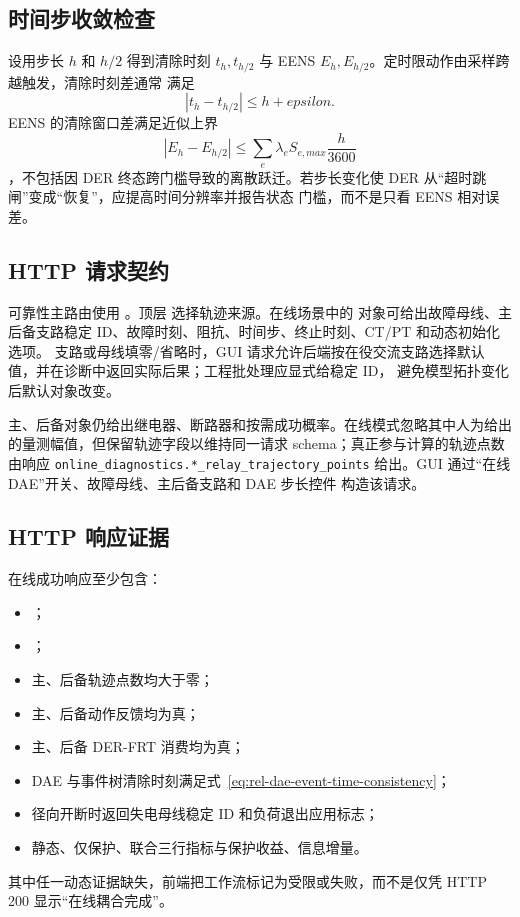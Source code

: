\subsection{时间步收敛检查}
设用步长 $h$ 和 $h/2$ 得到清除时刻 $t_h,t_{h/2}$ 与 EENS $E_h,E_{h/2}$。定时限动作由采样跨越触发，清除时刻差通常
满足
\begin{equation}
 |t_h-t_{h/2}|\le h+epsilon.
\end{equation}
EENS 的清除窗口差满足近似上界
\begin{equation}
 |E_h-E_{h/2}|\le\sum_e\lambda_e S_{e,max}\frac{h}{3600}
\end{equation}
，不包括因 DER 终态跨门槛导致的离散跃迁。若步长变化使 DER 从“超时跳闸”变成“恢复”，应提高时间分辨率并报告状态
门槛，而不是只看 EENS 相对误差。

\subsection{HTTP 请求契约}
可靠性主路由使用 。顶层
 选择轨迹来源。在线场景中的
 对象可给出故障母线、主后备支路稳定 ID、故障时刻、阻抗、时间步、终止时刻、CT/PT 和动态初始化选项。
支路或母线填零/省略时，GUI 请求允许后端按在役交流支路选择默认值，并在诊断中返回实际后果；工程批处理应显式给稳定 ID，
避免模型拓扑变化后默认对象改变。

主、后备对象仍给出继电器、断路器和按需成功概率。在线模式忽略其中人为给出的量测幅值，但保留轨迹字段以维持同一请求
schema；真正参与计算的轨迹点数由响应
\verb|online_diagnostics.*_relay_trajectory_points| 给出。GUI 通过“在线 DAE”开关、故障母线、主后备支路和 DAE 步长控件
构造该请求。

\subsection{HTTP 响应证据}
在线成功响应至少包含：
\begin{itemize}
 \item {}；
 \item {}；
 \item 主、后备轨迹点数均大于零；
 \item 主、后备动作反馈均为真；
 \item 主、后备 DER-FRT 消费均为真；
 \item DAE 与事件树清除时刻满足式~\eqref{eq:rel-dae-event-time-consistency}；
 \item 径向开断时返回失电母线稳定 ID 和负荷退出应用标志；
 \item 静态、仅保护、联合三行指标与保护收益、信息增量。
\end{itemize}
其中任一动态证据缺失，前端把工作流标记为受限或失败，而不是仅凭 HTTP 200 显示“在线耦合完成”。

